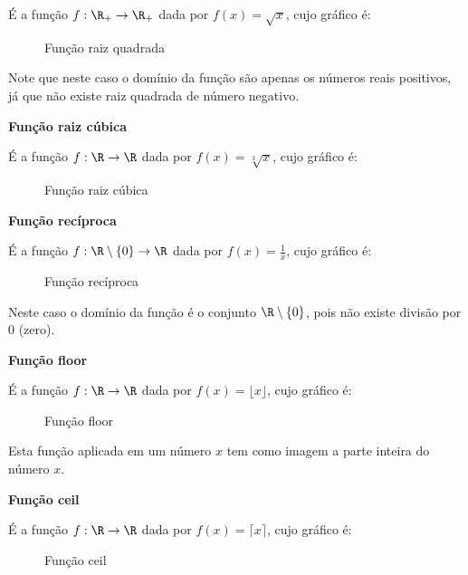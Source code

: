   É a função $f: \R_{+} \to \R_{+}$ dada por $f(x)= \sqrt{x}$, cujo gráfico é:

   \begin{figure}[H]
 \centering
    \caption{Função raiz quadrada}
  \end{figure}

  Note que neste caso o domínio da função são apenas os números reais positivos, já que não existe raiz quadrada de número negativo.

  \textbf{Função raiz cúbica}

  É a função $f: \R \to \R$ dada por $f(x)= \sqrt[3]{x}$, cujo gráfico é:

   \begin{figure}[H]
 \centering
    \caption{Função raiz cúbica}
  \end{figure}

  \textbf{Função recíproca}

  É a função $f: \R \setminus \{0\} \to \R$ dada por $f(x)= \frac{1}{x}$, cujo gráfico é:

   \begin{figure}[H]
 \centering
    \caption{Função recíproca}
  \end{figure}

  Neste caso o domínio da função é o conjunto $\R \setminus \{0\}$, pois não existe divisão por $0$ (zero).



  \textbf{Função floor}

  É a função $f: \R \to \R$ dada por $f(x)= \lfloor {x} \rfloor$, cujo gráfico é:

   \begin{figure}[H]
 \centering
    \caption{Função floor}
  \end{figure}

  Esta função aplicada em um número $x$ tem como imagem a parte inteira do número $x$.

  \textbf{Função ceil}

  É a função $f: \R \to \R$ dada por $f(x)= \lceil {x} \rceil$, cujo gráfico é:

   \begin{figure}[H]
 \centering
    \caption{Função ceil}
  \end{figure}

